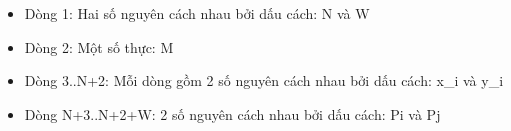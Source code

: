 \begin{itemize}
	\item     Dòng 1: Hai số nguyên cách nhau bởi dấu cách: N và W   
	\item     Dòng 2: Một số thực: M   
	\item     Dòng 3..N+2: Mỗi dòng gồm 2 số nguyên cách nhau bởi dấu cách: x\_i         và y\_i   
	\item     Dòng N+3..N+2+W: 2 số nguyên cách nhau bởi dấu cách: Pi và Pj   
\end{itemize}